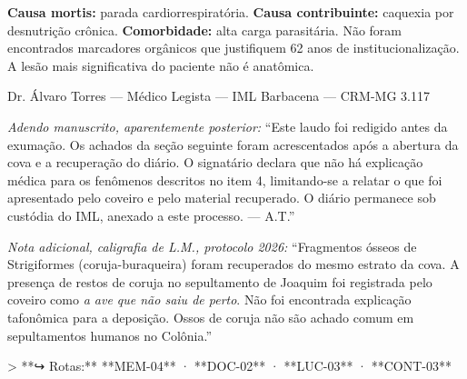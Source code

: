 \noindent \textbf{Causa mortis:} parada cardiorrespiratória. \textbf{Causa contribuinte:} caquexia por desnutrição crônica. \textbf{Comorbidade:} alta carga parasitária. Não foram encontrados marcadores orgânicos que justifiquem 62 anos de institucionalização. A lesão mais significativa do paciente não é anatômica.

\vspace{0.5em}
\noindent Dr. Álvaro Torres --- Médico Legista --- IML Barbacena --- CRM-MG 3.117

\vspace{0.8em}
\noindent \textit{Adendo manuscrito, aparentemente posterior:} ``Este laudo foi redigido antes da exumação. Os achados da seção seguinte foram acrescentados após a abertura da cova e a recuperação do diário. O signatário declara que não há explicação médica para os fenômenos descritos no item 4, limitando-se a relatar o que foi apresentado pelo coveiro e pelo material recuperado. O diário permanece sob custódia do IML, anexado a este processo. --- A.T.''

\vspace{0.5em}
\noindent \textit{Nota adicional, caligrafia de L.M., protocolo 2026:} ``Fragmentos ósseos de Strigiformes (coruja-buraqueira) foram recuperados do mesmo estrato da cova. A presença de restos de coruja no sepultamento de Joaquim foi registrada pelo coveiro como \textit{a ave que não saiu de perto}. Não foi encontrada explicação tafonômica para a deposição. Ossos de coruja não são achado comum em sepultamentos humanos no Colônia.''

> **↪ Rotas:** **MEM-04** · **DOC-02** · **LUC-03** · **CONT-03**
